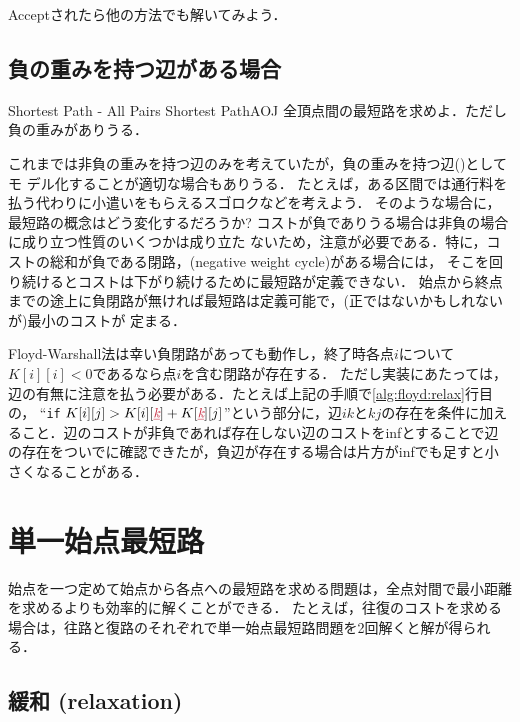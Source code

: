 Acceptされたら他の方法でも解いてみよう．

\subsection{負の重みを持つ辺がある場合}

\begin{psbox}{Shortest Path - All Pairs Shortest Path}{AOJ}
  全頂点間の最短路を求めよ．ただし負の重みがありうる．

\end{psbox}

これまでは非負の重みを持つ辺のみを考えていたが，負の重みを持つ辺()としてモ
デル化することが適切な場合もありうる．
たとえば，ある区間では通行料を払う代わりに小遣いをもらえるスゴロクなどを考えよう．
そのような場合に，最短路の概念はどう変化するだろうか?
コストが負でありうる場合は非負の場合に成り立つ性質のいくつかは成り立た
ないため，注意が必要である．特に，コストの総和が負である閉路，(negative weight cycle)がある場合には，
そこを回り続けるとコストは下がり続けるために最短路が定義できない．
始点から終点までの途上に負閉路が無ければ最短路は定義可能で，(正ではないかもしれないが)最小のコストが
定まる．

Floyd-Warshall法は幸い負閉路があっても動作し，終了時各点$i$について$K[i][i]<0$であるなら点$i$を含む閉路が存在する．
ただし実装にあたっては，辺の有無に注意を払う必要がある．たとえば上記の手順で\ref{alg:floyd:relax}行目の，
``\texttt{if} $K[i][j] > K[i][\cemph{k}]+K[\cemph{k}][j]$''という部分に，辺$ik$と$kj$の存在を条件に加えること．辺のコストが非負であれば存在しない辺のコストをinfとすることで辺の存在をついでに確認できたが，負辺が存在する場合は片方がinfでも足すと小さくなることがある．

\section{単一始点最短路} 

始点を一つ定めて始点から各点への最短路を求める問題は，全点対間で最小距離を求めるよりも効率的に解くことができる．
たとえば，往復のコストを求める場合は，往路と復路のそれぞれで単一始点最短路問題を2回解くと解が得られる．

\subsection{緩和 (relaxation)}

